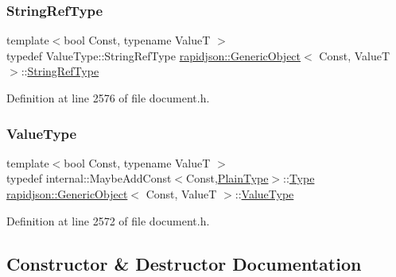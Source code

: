 \subsubsection{\texorpdfstring{StringRefType}{StringRefType}}
{\footnotesize\ttfamily template$<$bool Const, typename ValueT $>$ \\
typedef Value\+Type\+::\+String\+Ref\+Type \mbox{\hyperlink{classrapidjson_1_1_generic_object}{rapidjson\+::\+Generic\+Object}}$<$ Const, ValueT $>$\+::\mbox{\hyperlink{classrapidjson_1_1_generic_object_ab47bc8d841321d77c140e9df729f5233}{String\+Ref\+Type}}}



Definition at line 2576 of file document.\+h.

\mbox{\label{classrapidjson_1_1_generic_object_a282660500748eff5ebab93b88a9d478f}} 
\subsubsection{\texorpdfstring{ValueType}{ValueType}}
{\footnotesize\ttfamily template$<$bool Const, typename ValueT $>$ \\
typedef internal\+::\+Maybe\+Add\+Const$<$Const,\mbox{\hyperlink{classrapidjson_1_1_generic_object_a46c7868bddba87a819cccca94bbdbda9}{Plain\+Type}}$>$\+::\mbox{\hyperlink{namespacerapidjson_ae79a4751c1c460ff0de5ecc07874f3e4}{Type}} \mbox{\hyperlink{classrapidjson_1_1_generic_object}{rapidjson\+::\+Generic\+Object}}$<$ Const, ValueT $>$\+::\mbox{\hyperlink{classrapidjson_1_1_generic_object_a282660500748eff5ebab93b88a9d478f}{Value\+Type}}}



Definition at line 2572 of file document.\+h.



\subsection{Constructor \& Destructor Documentation}
\mbox{\label{classrapidjson_1_1_generic_object_aae420e2eac920ff10d5c749f567e4905}} 
